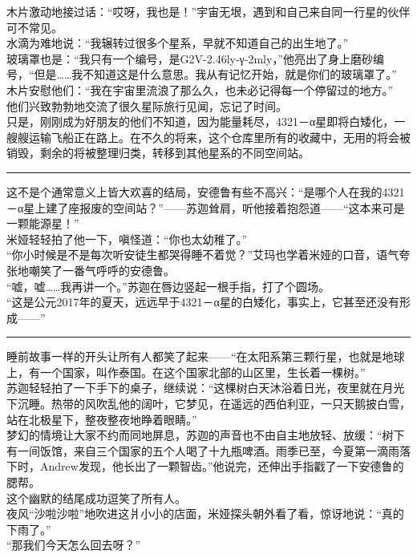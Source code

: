 \documentclass[oneside,11pt]{memoir} %
\begin{document}
\begin{CJK}{UTF8}{gbsn}
    木片激动地接过话：“哎呀，我也是！”宇宙无垠，遇到和自己来自同一行星的伙伴可不常见。\\\indent
    水滴为难地说：“我辗转过很多个星系，早就不知道自己的出生地了。”\\\indent
    玻璃罩也是：“我只有一个编号，是G2V-2.46ly-γ-2mly，”他亮出了身上磨砂编号，“但是……我不知道这是什么意思。我从有记忆开始，就是你们的玻璃罩了。”\\\indent
    木片安慰他们：“我在宇宙里流浪了那么久，也未必记得每一个停留过的地方。”\\\indent
    他们兴致勃勃地交流了很久星际旅行见闻，忘记了时间。\\\indent
    只是，刚刚成为好朋友的他们不知道，因为能量耗尽，4321－α星即将白矮化，一艘艘运输飞船正在路上。在不久的将来，这个仓库里所有的收藏中，无用的将会被销毁，剩余的将被整理归类，转移到其他星系的不同空间站。\\\indent
\rule{-3pt}{30pt}
    这不是个通常意义上皆大欢喜的结局，安德鲁有些不高兴：“是哪个人在我的4321－α星上建了座报废的空间站？”——苏迦耸肩，听他接着抱怨道——“这本来可是一颗能源星！”\\\indent
    米娅轻轻拍了他一下，嗔怪道：“你也太幼稚了。”\\\indent
    “你小时候是不是每次听安徒生都哭得睡不着觉？”艾玛也学着米娅的口音，语气夸张地嘲笑了一番气呼呼的安德鲁。\\\indent
    “嘘，嘘……我再讲一个。”苏迦在唇边竖起一根手指，打了个圆场。\\\indent
    “这是公元2017年的夏天，远远早于4321－α星的白矮化，事实上，它甚至还没有形成——”\\\indent
\rule{-3pt}{30pt}
    睡前故事一样的开头让所有人都笑了起来——“在太阳系第三颗行星，也就是地球上，有一个国家，叫作泰国。在这个国家北部的山区里，生长着一棵树。”\\\indent
    苏迦轻轻拍了一下手下的桌子，继续说：“这棵树白天沐浴着日光，夜里就在月光下沉睡。热带的风吹乱他的阔叶，它梦见，在遥远的西伯利亚，一只天鹅披白雪，站在北极星下，整夜整夜地睁着眼睛。”\\\indent
    梦幻的情境让大家不约而同地屏息，苏迦的声音也不由自主地放轻、放缓：“树下有一间饭馆，来自三个国家的五个人喝了十九瓶啤酒。雨季已至，今夏第一滴雨落下时，Andrew发现，他长出了一颗智齿。”他说完，还伸出手指戳了一下安德鲁的腮帮。\\\indent
    这个幽默的结尾成功逗笑了所有人。\\\indent
    夜风“沙啦沙啦”地吹进这爿小小的店面，米娅探头朝外看了看，惊讶地说：“真的下雨了。”\\\indent
    “那我们今天怎么回去呀？”\\\indent

\end{CJK}
\end{document}
